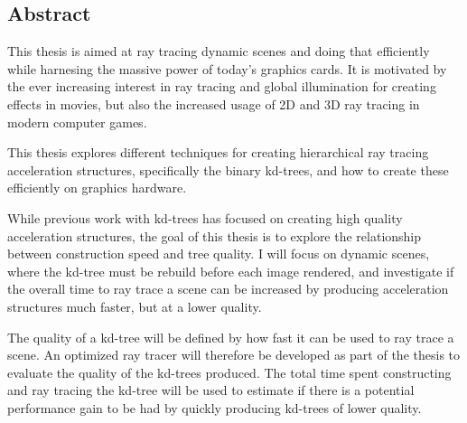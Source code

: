 

\begin{center}
\begin{minipage}{0.7\textwidth}
\section*{Abstract}

This thesis is aimed at ray tracing dynamic scenes and doing that efficiently
while harnesing the massive power of today's graphics cards. It is motivated by
the ever increasing interest in ray tracing and global illumination for creating
effects in movies, but also the increased usage of 2D and 3D ray tracing in
modern computer games.

This thesis explores different techniques for creating hierarchical ray tracing
acceleration structures, specifically the binary kd-trees, and how to create
these efficiently on graphics hardware.

While previous work with kd-trees has focused on creating high quality
acceleration structures, the goal of this thesis is to explore the relationship
between construction speed and tree quality. I will focus on dynamic scenes,
where the kd-tree must be rebuild before each image rendered, and investigate if
the overall time to ray trace a scene can be increased by producing acceleration
structures much faster, but at a lower quality.

The quality of a kd-tree will be defined by how fast it can be used to ray trace
a scene. An optimized ray tracer will therefore be developed as part of the
thesis to evaluate the quality of the kd-trees produced. The total time spent
constructing and ray tracing the kd-tree will be used to estimate if there is a
potential performance gain to be had by quickly producing kd-trees of lower
quality.

\end{minipage}
\end{center}


